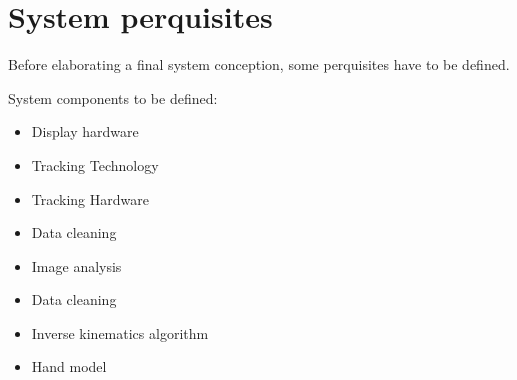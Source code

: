 \chapter{System perquisites}

Before elaborating a final system conception, some perquisites have to be defined.

System components to be defined:
\begin{itemize}
 \item Display hardware
 \item Tracking Technology
 \item Tracking Hardware
 \item Data cleaning
 \item Image analysis
 \item Data cleaning
 \item Inverse kinematics algorithm
 \item Hand model
 \end{itemize} 

